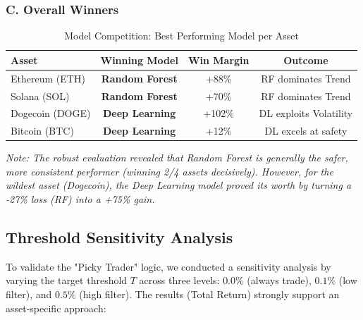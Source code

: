 \documentclass[11pt,a4paper]{article}
\begin{document}
\subsubsection{C. Overall Winners}
\begin{table}[H]
\centering
\caption{Model Competition: Best Performing Model per Asset}
\label{tab:competition}
\begin{tabular}{|l|c|c|c|}
\hline
\textbf{Asset} & \textbf{Winning Model} & \textbf{Win Margin} & \textbf{Outcome} \\
\hline
Ethereum (ETH) & \textbf{Random Forest} & +88\% & RF dominates Trend \\
Solana (SOL) & \textbf{Random Forest} & +70\% & RF dominates Trend \\
Dogecoin (DOGE) & \textbf{Deep Learning} & +102\% & DL exploits Volatility \\
Bitcoin (BTC) & \textbf{Deep Learning} & +12\% & DL excels at safety \\
\hline
\end{tabular}
\end{table}

\textit{Note: The robust evaluation revealed that Random Forest is generally the safer, more consistent performer (winning 2/4 assets decisively). However, for the wildest asset (Dogecoin), the Deep Learning model proved its worth by turning a -27\% loss (RF) into a +75\% gain.}

\subsection{Threshold Sensitivity Analysis}
To validate the "Picky Trader" logic, we conducted a sensitivity analysis by varying the target threshold $T$ across three levels: $0.0\%$ (always trade), $0.1\%$ (low filter), and $0.5\%$ (high filter). The results (Total Return) strongly support an asset-specific approach:
\end{document}
